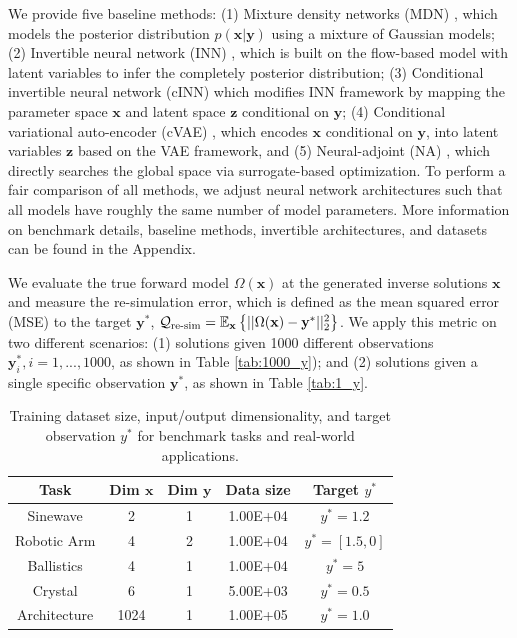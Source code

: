 \documentclass[letterpaper]{article}
\begin{document}
 We provide five baseline methods: (1) Mixture density networks (MDN) \citep{bishop1994mixture}, which models the posterior distribution $p(\mathbf{x}|\mathbf{y})$ using a mixture of Gaussian models; (2) Invertible neural network (INN) \citep{ardizzone2018analyzing}, which is built on the flow-based model with latent variables to infer the completely posterior distribution; (3) Conditional invertible neural network (cINN) \citep{ardizzone2019guided, rombach2020network} which modifies INN framework by mapping the parameter space $\mathbf{x}$ and latent space $\mathbf{z}$ conditional on $\mathbf{y}$; (4) Conditional variational auto-encoder (cVAE) \citep{sohn2015learning}, which encodes $\mathbf{x}$ conditional on $\mathbf{y}$, into latent variables $\mathbf{z}$ based on the VAE framework, and (5) Neural-adjoint (NA) \cite{ren2020benchmarking}, which directly searches the global space
via surrogate-based optimization. To perform a fair comparison of all methods, we adjust neural network architectures such that all models have roughly the same number of model parameters. More information on benchmark details, baseline methods, invertible architectures, and datasets can be found in the Appendix.

 We evaluate the true forward model $\Omega(\mathbf{x})$ at the generated inverse solutions $\mathbf{x}$ and measure the re-simulation error, which is defined as the mean squared error (MSE) to the target $\mathbf{y}^*$, $\mathcal{Q}_{\textup{re-sim}} = \mathbb{E}_{\mathbf{x}}\left\{ ||\Omega(\mathbf{x}) - \mathbf{y}^*||_2^2 \right\}$.
We apply this metric on two different scenarios: (1) solutions given 1000 different observations $\mathbf{y}_i^*, i=1,...,1000$, as shown in Table \ref{tab:1000_y}); and (2) solutions given a single specific observation $\mathbf{y}^*$, as shown in Table \ref{tab:1_y}.
\begin{table}[h!]
\footnotesize
\centering
\caption{Training dataset size, input/output dimensionality, and target observation $y^*$ for benchmark tasks and real-world applications.}
\label{tab:dataset}
\begin{adjustbox}{width=0.22\columnwidth}
\begin{tabular}{@{}ccccc@{}}
\toprule
Task        & Dim $\mathbf{x}$ & Dim $\mathbf{y}$ & Data size & Target  $y^*$ \\ \midrule
Sinewave        & 2     & 1         & 1.00E+04  & $y^*=1.2$     \\
Robotic Arm & 4     & 2         & 1.00E+04 & $y^*=[1.5,0]$     \\
Ballistics  & 4     & 1          & 1.00E+04 & $y^*=5$     \\
Crystal     & 6     & 1          & 5.00E+03  & $y^*=0.5$    \\
Architecture     & 1024     & 1          & 1.00E+05  & $y^*=1.0$    \\
\bottomrule
\end{tabular}
\end{adjustbox}
\end{table}
\end{document}
